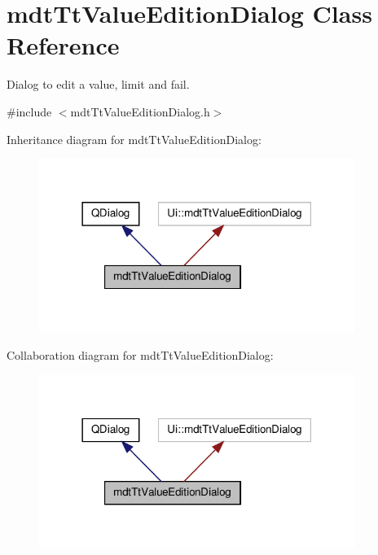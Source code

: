 \hypertarget{classmdt_tt_value_edition_dialog}{\section{mdt\-Tt\-Value\-Edition\-Dialog Class Reference}
\label{classmdt_tt_value_edition_dialog}
}


Dialog to edit a value, limit and fail.  




{\ttfamily \#include $<$mdt\-Tt\-Value\-Edition\-Dialog.\-h$>$}



Inheritance diagram for mdt\-Tt\-Value\-Edition\-Dialog\-:\nopagebreak
\begin{figure}[H]
\begin{center}
\leavevmode
\includegraphics[width=290pt]{classmdt_tt_value_edition_dialog__inherit__graph}
\end{center}
\end{figure}


Collaboration diagram for mdt\-Tt\-Value\-Edition\-Dialog\-:\nopagebreak
\begin{figure}[H]
\begin{center}
\leavevmode
\includegraphics[width=290pt]{classmdt_tt_value_edition_dialog__coll__graph}
\end{center}
\end{figure}
